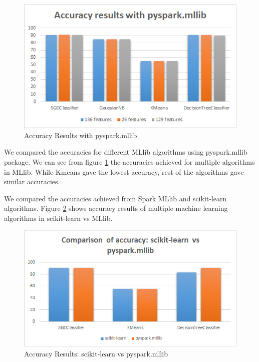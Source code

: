 \documentclass[9pt,twocolumn,twoside]{../../styles/osajnl}
\begin{document}
\begin{figure}[h]
\centering
\includegraphics[width=\linewidth,scale=1]{images/accmllib}
\caption{Accuracy Results with pyspark.mllib}
\label{fig:accmllib}
\end{figure}

We compared the accuracies for different MLlib algorithms using pyspark.mllib package. We can see from figure \ref{fig:accmllib} the accuracies achieved for multiple algorithms in MLlib. While Kmeans gave the lowest accuracy, rest of the algorithms gave similar accuracies.



We compared the accuracies achieved from Spark MLlib and scikit-learn algorithms. Figure \ref{fig:mllibvssklearn} shows accuracy results of multiple machine learning algorithms in scikit-learn vs MLlib.

\begin{figure}[h]
\centering
\includegraphics[width=\linewidth,scale=1]{images/mllibvssklearn}
\caption{Accuracy Results: scikit-learn vs pyspark.mllib}
\label{fig:mllibvssklearn}
\end{figure}
\end{document}
